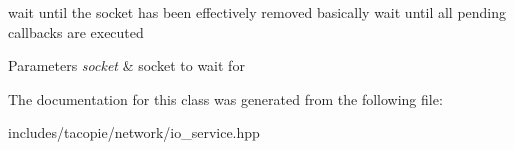 wait until the socket has been effectively removed basically wait until all pending callbacks are executed


\begin{DoxyParams}{Parameters}
{\em socket} & socket to wait for \\
\hline
\end{DoxyParams}


The documentation for this class was generated from the following file\+:\begin{DoxyCompactItemize}
\item 
includes/tacopie/network/io\+\_\+service.\+hpp\end{DoxyCompactItemize}
